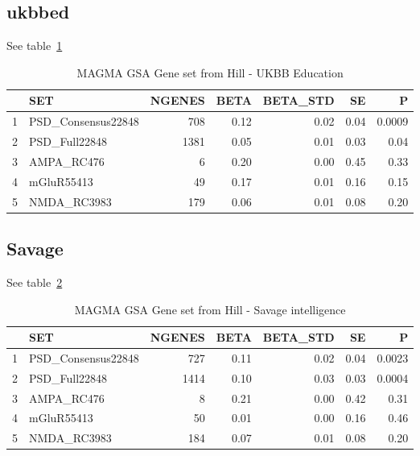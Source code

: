 \subsection{ukbbed}
See table~\ref{table:MAGMA_GSA_HILL_SET_UKBBEducation}
\begin{table}[ht]
\centering
\begin{tabular}{rlrrrrr}
  \hline
 & SET & NGENES & BETA & BETA\_STD & SE & P \\ 
  \hline
1 & PSD\_Consensus22848 & 708 & 0.12 & 0.02 & 0.04 & 0.0009 \\ 
  2 & PSD\_Full22848 & 1381 & 0.05 & 0.01 & 0.03 & 0.04 \\ 
  3 & AMPA\_RC476 &   6 & 0.20 & 0.00 & 0.45 & 0.33 \\ 
  4 & mGluR55413 &  49 & 0.17 & 0.01 & 0.16 & 0.15 \\ 
  5 & NMDA\_RC3983 & 179 & 0.06 & 0.01 & 0.08 & 0.20 \\ 
   \hline
\end{tabular}
\caption{MAGMA GSA Gene set from Hill - UKBB Education}
\label{table:MAGMA_GSA_HILL_SET_UKBBEducation}
\end{table}

\subsection{Savage}
See table~\ref{table:MAGMA_GSA_HILL_SET_SAVAGE_intelligence}
\begin{table}[ht]
\centering
\begin{tabular}{rlrrrrr}
  \hline
 & SET & NGENES & BETA & BETA\_STD & SE & P \\ 
  \hline
1 & PSD\_Consensus22848 & 727 & 0.11 & 0.02 & 0.04 & 0.0023 \\ 
  2 & PSD\_Full22848 & 1414 & 0.10 & 0.03 & 0.03 & 0.0004 \\ 
  3 & AMPA\_RC476 &   8 & 0.21 & 0.00 & 0.42 & 0.31 \\ 
  4 & mGluR55413 &  50 & 0.01 & 0.00 & 0.16 & 0.46 \\ 
  5 & NMDA\_RC3983 & 184 & 0.07 & 0.01 & 0.08 & 0.20 \\ 
   \hline
\end{tabular}
\caption{MAGMA GSA Gene set from Hill - Savage intelligence}
\label{table:MAGMA_GSA_HILL_SET_SAVAGE_intelligence}
\end{table}


